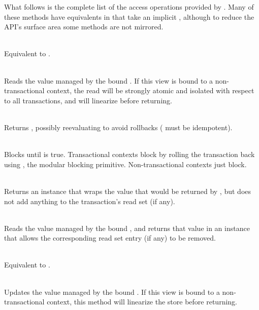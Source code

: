
What follows is the complete list of the access operations provided by
.  Many of these methods have equivalents in 
that take an implicit , although to reduce the API's surface
area some methods are not mirrored.

{
\setlength{\leftskip}{12pt}
\setlength{\parindent}{-12pt}
\setlength{\parskip}{3pt}

\vspace{2pt}

\\ Equivalent to .

\\ Reads the value managed by the
bound .  If this view is bound to a non-transactional context,
the read will be strongly atomic and isolated with respect to all
transactions, and will linearize before returning.

\code{map[}\code{](f: }\code{ => }\code{): }\\
Returns , possibly reevaluating 
to avoid rollbacks ( must be idempotent).

\code{ => }\code{) }\\ Blocks
until  is true.  Transactional contexts block by rolling
the transaction back using , the modular blocking primitive.
Non-transactional contexts just block.

\code{[}\code{] }\\
Returns an instance that wraps the value that would be returned by
, but does not add anything to the transaction's read set
(if any).

\code{[}\code{] }\\
Reads the value managed by the bound , and returns that
value in an instance that allows the corresponding read set entry (if any)
to be removed.

\vspace{3pt}

\code{) }\\ Equivalent to .

\code{) }\\ Updates the value managed by the
bound .  If this view is bound to a non-transactional context,
this method will linearize the store before returning.

}
